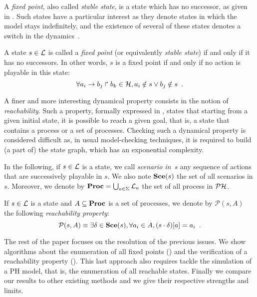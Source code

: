 A \emph{fixed point}, also called \emph{stable state},
is a state which has no successor,
as given in .
Such states have a particular interest as they denote states in which the model
stays indefinitely,
and the existence of several of these states denotes a switch in the dynamics~\cite{wuensche1998genomic}.

\begin{definition}
\label{def:fixpoint}
  A state $s \in \mathcal{L}$ is called a \emph{fixed point}
  (or equivalently \emph{stable state})
  if and only if it has no successors.
  In other words, $s$ is a fixed point if and only if no action is playable in this state:
  \[\forall a_i\rightarrow b_j\Rsh b_k \in \mathcal{H}, a_i \notin s \vee b_j \notin s \enspace.\]
\end{definition}

A finer and more interesting dynamical property consists in
the notion of \emph{reachability}.
Such a property, formally expressed in ,
states that starting from a given initial state, it is possible
to reach a given goal, that is, a state that contains a process
or a set of processes.
Checking such a dynamical property is considered difficult
as, in usual model-checking techniques,
it is required to build (a part of) the state graph,
which has an exponential complexity.

In the following, if $s \in \mathcal{L}$ is a state,
we call \emph{scenario in~$s$}
any sequence of actions that are successively playable in $s$.
We also note $\mathbf{Sce}(s)$ the set of all scenarios in $s$.
Moreover, we denote by $\mathbf{Proc} = \bigcup_{a \in \Sigma} \mathcal{L}_a$
the set of all process in $\mathcal{PH}$.

\begin{definition}
\label{def:reachability}
  If $s \in \mathcal{L}$ is a state and $A \subseteq \mathbf{Proc}$ is a set of processes,
  we denote by $\mathcal{P}(s, A)$ the following \emph{reachability property}:
  \[\mathcal{P}(s, A) \equiv \exists \delta \in \mathbf{Sce}(s), \forall a_i \in A, {(s \cdot \delta)[a]} = a_i
    \enspace.\]
\end{definition}

The rest of the paper focuses on the resolution of the previous issues. We show algorithms about
the enumeration of all fixed points () and the verification of a reachability property ().
This last approach also requires tackle the simulation of a PH model, that is, the enumeration of all reachable states.
Finally we compare our results to other existing methods and we give their respective strengths and limits.
